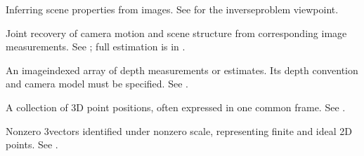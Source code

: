 \documentclass[letterpaper,11pt,english,openany,oneside]{jupyterBook}
\begin{document}
\begin{description}
\sphinxAtStartPar
Inferring scene properties from images. See {\hyperref[\detokenize{lectures/lecture01/motivation:lec01-motivation}]{}} for the inverse\sphinxhyphen{}problem viewpoint.

\sphinxAtStartPar
Joint recovery of camera motion and scene structure from corresponding image measurements. See {\hyperref[\detokenize{lectures/lecture01/motivation:lec01-motivation}]{}}; full estimation is in {\hyperref[\detokenize{lectures/lecture06/pipeline:lec06-pipeline}]{}}.

\sphinxAtStartPar
An image\sphinxhyphen{}indexed array of depth measurements or estimates. Its depth convention and camera model must be specified. See {\hyperref[\detokenize{lectures/lecture01/cameras:lec01-cameras}]{}}.

\sphinxAtStartPar
A collection of 3D point positions, often expressed in one common frame. See {\hyperref[\detokenize{lectures/lecture01/quiz-workbook:ex-lec01-depth}]{}}.

\sphinxAtStartPar
Nonzero 3\sphinxhyphen{}vectors identified under nonzero scale, representing finite and ideal 2D points. See {\hyperref[\detokenize{lectures/lecture01/projective:lec01-projective}]{}}.


\end{description}
\end{document}
